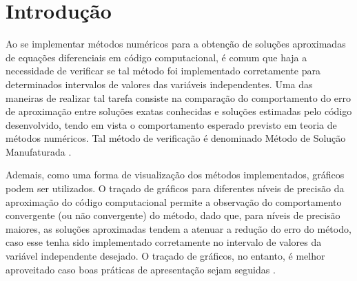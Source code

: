 \documentclass[twocolumn,amsmath,amssymb,floatfix]{revtex4}
\begin{document}



\section{Introdução}
Ao se implementar métodos numéricos para a obtenção de soluções aproximadas de equações diferenciais em código computacional, é comum que haja a necessidade de verificar se tal método foi implementado corretamente para determinados intervalos de valores das variáveis independentes. Uma das maneiras de realizar tal tarefa consiste na comparação do comportamento do erro de aproximação entre soluções exatas conhecidas e soluções estimadas pelo código desenvolvido, tendo em vista o comportamento esperado previsto em teoria de métodos numéricos. Tal método de verificação é denominado Método de Solução Manufaturada \cite{livroProfAlexandre}.

Ademais, como uma forma de visualização dos métodos implementados, gráficos podem ser utilizados. O traçado de gráficos para diferentes níveis de precisão da aproximação do código computacional permite a observação do comportamento convergente (ou não convergente) do método, dado que, para níveis de precisão maiores, as soluções aproximadas tendem a atenuar a redução do erro do método, caso esse tenha sido implementado corretamente no intervalo de valores da variável independente desejado. O traçado de gráficos, no entanto, é melhor aproveitado caso boas práticas de apresentação sejam seguidas \cite{tarefaProfAlexandre}.
\end{document}
